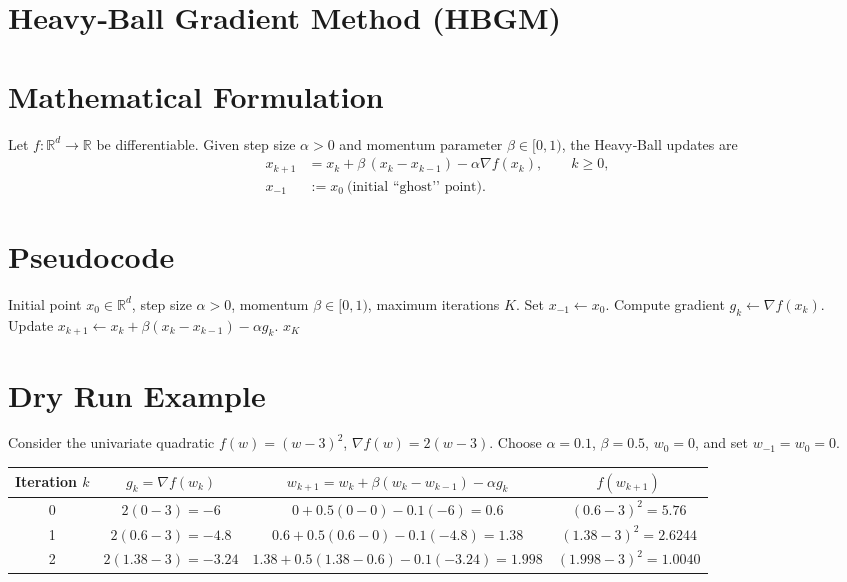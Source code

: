 \documentclass{article}
\begin{document}
\section*{Heavy‑Ball Gradient Method (HBGM)}

\section*{Mathematical Formulation}
Let $f:\mathbb{R}^{d}\rightarrow\mathbb{R}$ be differentiable.  
Given step size $\alpha>0$ and momentum parameter $\beta\in[0,1)$, the Heavy‑Ball updates are
\[
\boxed{
\begin{aligned}
x_{k+1}&=x_{k}+ \beta\,(x_{k}-x_{k-1})-\alpha \nabla f(x_{k}),\qquad k\ge 0,\\
x_{-1}&:=x_{0}\ \text{(initial “ghost’’ point).}
\end{aligned}}
\tag{HB}
\]

\section*{Pseudocode}
\begin{algorithm}[H]
\caption{Heavy‑Ball Gradient Method}
\begin{algorithmic}[1]
\REQUIRE Initial point $x_{0}\in\mathbb{R}^{d}$, step size $\alpha>0$, momentum $\beta\in[0,1)$, maximum iterations $K$.
\STATE Set $x_{-1}\gets x_{0}$.
    \STATE Compute gradient $g_{k}\gets \nabla f(x_{k})$.
    \STATE Update $x_{k+1}\gets x_{k}+ \beta (x_{k}-x_{k-1})-\alpha g_{k}$.
\ENDFOR
\RETURN $x_{K}$
\end{algorithmic}
\end{algorithm}

\section*{Dry Run Example}
Consider the univariate quadratic $f(w)=(w-3)^{2}$, $\nabla f(w)=2(w-3)$.  
Choose $\alpha=0.1$, $\beta=0.5$, $w_{0}=0$, and set $w_{-1}=w_{0}=0$.

\begin{tabular}{c|c|c|c}
Iteration $k$ & $g_{k}= \nabla f(w_{k})$ & $w_{k+1}= w_{k}+ \beta (w_{k}-w_{k-1})-\alpha g_{k}$ & $f(w_{k+1})$\\ \hline
0 & $2(0-3)=-6$ & $0+0.5(0-0)-0.1(-6)=0.6$ & $(0.6-3)^{2}=5.76$\\
1 & $2(0.6-3)=-4.8$ & $0.6+0.5(0.6-0)-0.1(-4.8)=1.38$ & $(1.38-3)^{2}=2.6244$\\
2 & $2(1.38-3)=-3.24$ & $1.38+0.5(1.38-0.6)-0.1(-3.24)=1.998$ & $(1.998-3)^{2}=1.0040$
\end{tabular}
\end{document}
